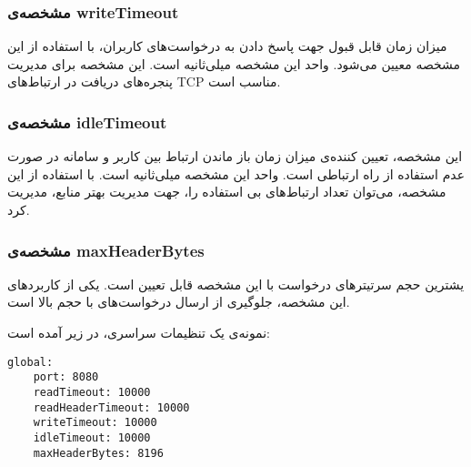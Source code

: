 \subsubsection*{مشخصه‌ی writeTimeout}
میزان زمان قابل قبول جهت پاسخ دادن به درخواست‌های کاربران، با استفاده از این مشخصه معیین می‌شود. واحد این مشخصه میلی‌ثانیه است. این مشخصه برای مدیریت پنجره‌های دریافت در ارتباط‌های TCP مناسب است.

\subsubsection*{مشخصه‌ی idleTimeout}
این مشخصه، تعیین کننده‌ی میزان زمان باز ماندن ارتباط بین کاربر و سامانه در صورت عدم استفاده از راه ارتباطی است. واحد این مشخصه میلی‌ثانیه است. با استفاده از این مشخصه، می‌توان تعداد ارتباط‌های بی استفاده را، جهت مدیریت بهتر منابع،‌ مدیریت کرد.

\subsubsection*{مشخصه‌ی maxHeaderBytes}
یشترین حجم سرتیتر‌های درخواست با این مشخصه قابل تعیین است. یکی از کاربرد‌های این مشخصه، جلوگیری از ارسال درخواست‌های با حجم بالا است.

نمونه‌ی یک تنظیمات سراسری، در زیر آمده است:

\begin{latin}
    \begin{lstlisting}
global:
    port: 8080
    readTimeout: 10000
    readHeaderTimeout: 10000
    writeTimeout: 10000
    idleTimeout: 10000
    maxHeaderBytes: 8196
    \end{lstlisting}
\end{latin}

